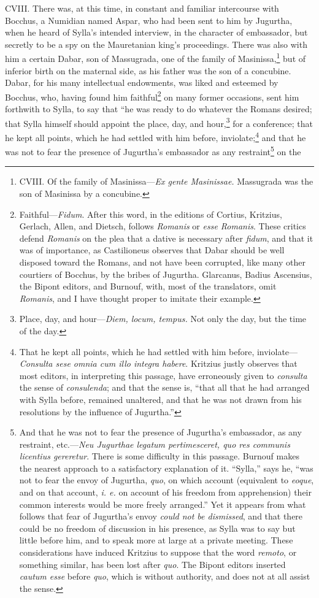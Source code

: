 CVIII. There was, at this time, in constant and familiar intercourse
with Bocchus, a Numidian named Aspar, who had been sent to him by
Jugurtha, when he heard of Sylla's intended interview, in the
character of embassador, but secretly to be a spy on the Mauretanian
king's proceedings. There was also with him a certain Dabar, son of
Massugrada, one of the family of Masinissa,\footnote{CVIII. Of the family of Masinissa—\emph{Ex gente Masinissae.}
Massugrada was the son of Masinissa by a concubine.} but of inferior birth
on the maternal side, as his father was the son of a concubine. Dabar,
for his many intellectual endowments, was liked and esteemed by
Bocchus, who, having found him faithful\footnote{Faithful—\emph{Fidum}. After this word, in the editions of Cortius,
Kritzius, Gerlach, Allen, and Dietsch, follows \emph{Romanis} or \emph{esse
Romanis}. These critics defend \emph{Romanis} on the plea that a dative
is necessary after \emph{fidum}, and that it was of importance, as
Castilioneus observes that Dabar should be well disposed toward the
Romans, and not have been corrupted, like many other courtiers of
Bocchus, by the bribes of Jugurtha. Glarcanus, Badius Ascensius, the
Bipont editors, and Burnouf, with, most of the translators, omit
\emph{Romanis}, and I have thought proper to imitate their example.} on many former occasions,
sent him forthwith to Sylla, to say that ``he was ready to do whatever
the Romans desired; that Sylla himself should appoint the place, day,
and hour,\footnote{Place, day, and hour—\emph{Diem, locum, tempus.} Not only the
day, but the time of the day.} for a conference; that he kept all points, which he had
settled with him before, inviolate;\footnote{That he kept all points, which he had settled with him
before, inviolate—\emph{Consulta sese omnia cum illo integra habere}.
Kritzius justly observes that most editors, in interpreting this
passage, have erroneously given to \emph{consulta} the sense of
\emph{consulenda}; and that the sense is, ``that all that he had arranged
with Sylla before, remained unaltered, and that he was not drawn from
his resolutions by the influence of Jugurtha.''} and that he was not to fear
the presence of Jugurtha's embassador as any restraint\footnote{And that he was not to fear the presence of Jugurtha's
embassador, as any restraint, etc.—\emph{Neu Jugurthae legatum
pertimesceret, quo res communis licentius gereretur}. There is some
difficulty in this passage. Burnouf makes the nearest approach to a
satisfactory explanation of it. ``Sylla,'' says he, ``was not to fear the
envoy of Jugurtha, \emph{quo}, on which account (equivalent to \emph{eoque}, and
on that account, \emph{i. e.} on account of his freedom from apprehension)
their common interests would be more freely arranged.'' Yet it appears
from what follows that fear of Jugurtha's envoy \emph{could not be
dismissed}, and that there could be no freedom of discussion in his
presence, as Sylla was to say but little before him, and to speak more
at large at a private meeting. These considerations have induced
Kritzius to suppose that the word \emph{remoto}, or something similar, has
been lost after \emph{quo}. The Bipont editors inserted \emph{cautum esse}
before \emph{quo}, which is without authority, and does not at all assist
the sense.} on the
